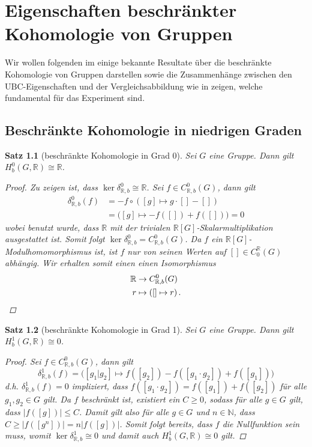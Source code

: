 \documentclass[a4paper,twoside,10pt]{scrreprt}
\newcommand{\N}{\mathbb{N}}
\newcommand{\R}{\mathbb{R}}
\newtheorem{satz}{Satz}[section]
\theoremstyle{definition}
\begin{document}
\chapter{Eigenschaften beschränkter Kohomologie von Gruppen}
Wir wollen folgenden im einige bekannte Resultate über die beschränkte Kohomologie von Gruppen darstellen sowie die Zusammenhänge zwischen den $\text{UBC}$-Eigenschaften und der Vergleichsabbildung wie in \cite[Theorem 2.8]{matsumoto} zeigen, welche fundamental für das Experiment sind.
\section{Beschränkte Kohomologie in niedrigen Graden}\label{sec:BoundedCohomInLowDeg}
\begin{satz}[beschränkte Kohomologie in Grad 0]
Sei $G$ eine Gruppe. Dann gilt $H_b^0(G,\R)\cong \R$.
\begin{proof}
Zu zeigen ist, dass $\ker \delta_{\R,b}^0\cong \R$. Sei $f\in C_{\R,b}^0(G)$, dann gilt
\begin{align*}
\delta_{\R,b}^0(f)&=-f\circ \left([g]\mapsto g\cdot[]-[]\right)\\
&=\bigl([g]\mapsto -f\left([]\right)+f\left([]\right)\bigr)=0
\end{align*}
wobei benutzt wurde, dass $\R$ mit der trivialen $\R[G]$-Skalarmultiplikation ausgestattet ist. Somit folgt $\ker \delta_{\R,b}^0=C_{\R,b}^0(G)$.
Da $f$ ein $\R[G]$-Modulhomomorphismus ist, ist $f$ nur von seinen Werten auf $[]\in C_0^{\R}(G)$ abhängig. Wir erhalten somit einen einen Isomorphismus
\begin{align*}
\R&\to C_{\R,b}^0(G)\\
r&\mapsto \left([]\mapsto r\right).\qedhere
\end{align*} 
\end{proof}
\end{satz}
\begin{satz}[beschränkte Kohomologie in Grad 1]
Sei $G$ eine Gruppe. Dann gilt $H_b^1(G,\R)\cong 0$.
\begin{proof}
Sei $f\in C_{\R,b}^0(G)$, dann gilt
\begin{equation*}
\delta_{\R,b}^1(f)=\biggl([g_1|g_2]\mapsto f\left([g_2]\right)-f\left([g_1\cdot g_2]\right)+f\left([g_1]\right)\biggr)
\end{equation*}
d.h. $\delta_{\R,b}^1(f)=0$ impliziert, dass $f([g_1\cdot g_2])=f([g_1])+f([g_2])$ für alle $g_1,g_2\in G$ gilt.
Da $f$ beschränkt ist, existiert ein $C\geq 0$, sodass für alle $g\in G$ gilt, dass $|f([g])|\leq C$.
Damit gilt also für alle $g\in G$ und $n\in \N$, dass $C\geq|f([g^n])|=n|f([g])|$. Somit folgt bereits, dass $f$ die Nullfunktion sein muss, womit $\ker \delta_{\R,b}^1\cong 0$ und damit auch $H_b^1(G,\R)\cong 0$ gilt.
\end{proof}
\end{satz}
\end{document}
